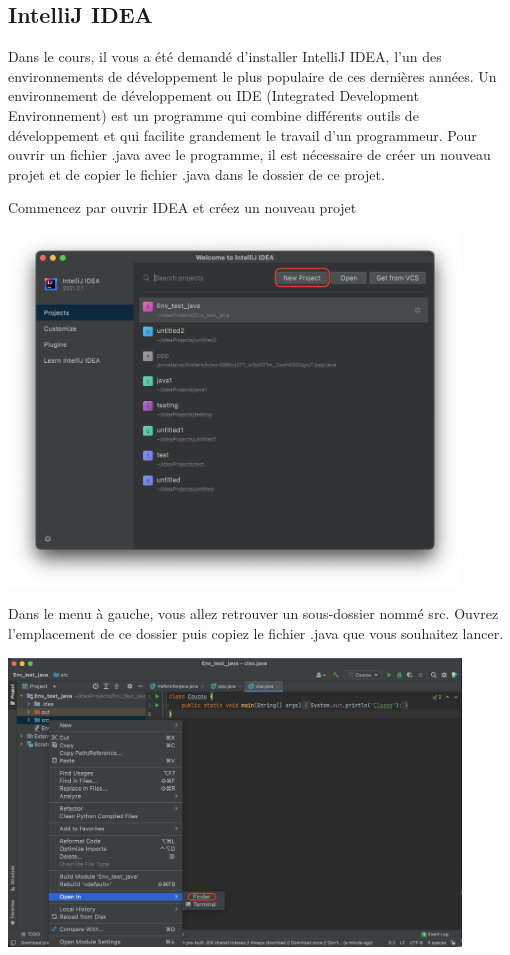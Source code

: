 \subsection{IntelliJ IDEA}

Dans le cours, il vous a été demandé d'installer IntelliJ IDEA, l'un des environnements de développement le plus populaire de ces dernières années. Un environnement de développement ou IDE (Integrated Development Environnement) est un programme qui combine différents outils de développement et qui facilite grandement le travail d'un programmeur. Pour ouvrir un fichier .java avec le programme, il est nécessaire de créer un nouveau projet et de copier le fichier .java dans le dossier de ce projet.

Commencez par ouvrir IDEA et créez un nouveau projet

\begin{center}
	\includegraphics[width=12cm]{np}	
\end{center}
 

Dans le menu à gauche, vous allez retrouver un sous-dossier nommé src. Ouvrez l'emplacement de ce dossier puis copiez le fichier .java que vous souhaitez lancer.

\begin{center}
	\includegraphics[width=12cm]{finder}	
\end{center}

